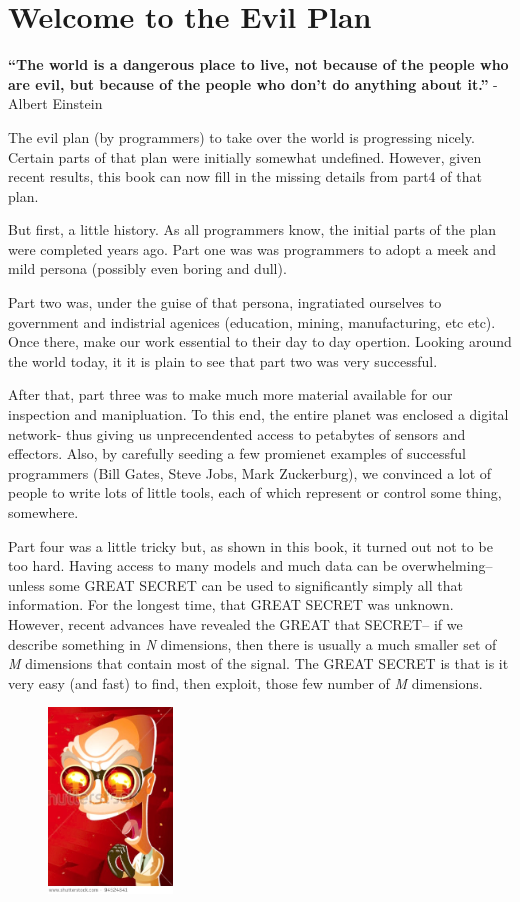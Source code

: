 \section{Welcome to the Evil Plan}\label{welcome-to-the-evil-plan}

\textbf{``The world is a dangerous place to live, not because of the
people who are evil, but because of the people who don't do anything
about it.''} - Albert Einstein

The evil plan (by programmers) to take over the world is progressing
nicely. Certain parts of that plan were initially somewhat undefined.
However, given recent results, this book can now fill in the missing
details from part4 of that plan.

But first, a little history. As all programmers know, the initial parts
of the plan were completed years ago. Part one was was programmers to
adopt a meek and mild persona (possibly even boring and dull).

Part two was, under the guise of that persona, ingratiated ourselves to
government and indistrial agenices (education, mining, manufacturing,
etc etc). Once there, make our work essential to their day to day
opertion. Looking around the world today, it it is plain to see that
part two was very successful.

After that, part three was to make much more material available for our
inspection and manipluation. To this end, the entire planet was enclosed
a digital network- thus giving us unprecendented access to petabytes of
sensors and effectors. Also, by carefully seeding a few promienet
examples of successful programmers (Bill Gates, Steve Jobs, Mark
Zuckerburg), we convinced a lot of people to write lots of little tools,
each of which represent or control some thing, somewhere.

Part four was a little tricky but, as shown in this book, it turned out
not to be too hard. Having access to many models and much data can be
overwhelming-- unless some GREAT SECRET can be used to significantly
simply all that information. For the longest time, that GREAT SECRET was
unknown. However, recent advances have revealed the GREAT that SECRET--
if we describe something in \emph{N} dimensions, then there is usually a
much smaller set of \emph{M} dimensions that contain most of the signal.
The GREAT SECRET is that is it very easy (and fast) to find, then
exploit, those few number of \emph{M} dimensions.

\begin{figure}
\includegraphics[width=1.3in]{img/evillaugh.jpg}
\end{figure}

